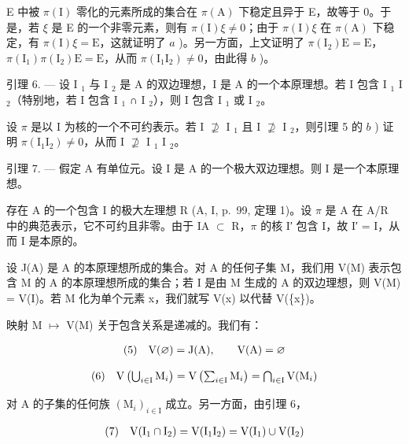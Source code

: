 E 中被 \(\pi(\mathrm{I})\) 零化的元素所成的集合在 \(\pi(\mathrm{A})\) 下稳定且异于 E，故等于 0。于是，若 \(\xi\) 是 E 的一个非零元素，则有 \(\pi(\mathrm{I})\xi \neq 0\)；由于 \(\pi(\mathrm{I})\xi\) 在 \(\pi(\mathrm{A})\) 下稳定，有 \(\pi(\mathrm{I})\xi = \mathrm{E}\)，这就证明了 \(a\) )。另一方面，上文证明了 \(\pi(\mathrm{I}_2)\mathrm{E} = \mathrm{E}\)，\(\pi(\mathrm{I}_1)\pi(\mathrm{I}_2)\mathrm{E} = \mathrm{E}\)，从而 \(\pi(\mathrm{I}_1\mathrm{I}_2) \neq 0\)，由此得 \(b\) )。

引理 6. --- 设 I \(_{1}\) 与 I \(_{2}\) 是 A 的双边理想，I 是 A 的一个本原理想。若 I 包含 I \(_{1}\) I \(_{2}\)（特别地，若 I 包含 I \(_{1}\) ∩ I \(_{2}\)），则 I 包含 I \(_{1}\) 或 I \(_{2}\)。

设 \(\pi\) 是以 I 为核的一个不可约表示。若 I \(\not\supseteq\) I \(_1\) 且 I \(\not\supseteq\) I \(_2\)，则引理 5 的 \(b\) ) 证明 \(\pi(\text{I}_1\text{I}_2) \neq 0\)，从而 I \(\not\supseteq\) I \(_1\) I \(_2\)。

引理 7. --- 假定 A 有单位元。设 I 是 A 的一个极大双边理想。则 I 是一个本原理想。

存在 A 的一个包含 I 的极大左理想 R (A, I, p.~99, 定理 1)。设 \(\pi\) 是 A 在 A/R 中的典范表示，它不可约且非零。由于 IA \(\subset\) R，\(\pi\) 的核 I′ 包含 I，故 I′ = I，从而 I 是本原的。

设 J(A) 是 A 的本原理想所成的集合。对 A 的任何子集 M，我们用 V(M) 表示包含 M 的 A 的本原理想所成的集合；若 I 是由 M 生成的 A 的双边理想，则 V(M) = V(I)。若 M 化为单个元素 x，我们就写 V(x) 以代替 V(\{x\})。

映射 M \(\mapsto\) V(M) 关于包含关系是递减的。我们有：

\[
\begin{array}{r l} (5) & \mathrm{V} (\varnothing) = \mathrm{J} (\mathrm{A}), \qquad \mathrm{V} (\mathrm{A}) = \varnothing \end{array}
\]

\[
\begin{array}{r l} (6) & \mathrm{V} \left(\bigcup_ {i \in \mathrm{I}} \mathrm{M} _ {i}\right) = \mathrm{V} \left(\sum_ {i \in \mathrm{I}} \mathrm{M} _ {i}\right) = \bigcap_ {i \in \mathrm{I}} \mathrm{V} (\mathrm{M} _ {i}) \end{array}
\]

对 A 的子集的任何族 \((\mathrm{M}_{i})_{i\in\mathrm{I}}\) 成立。另一方面，由引理 6，

\[
\begin{array}{r l} (7) & \mathrm{V} (\mathrm{I} _ {1} \cap \mathrm{I} _ {2}) = \mathrm{V} (\mathrm{I} _ {1} \mathrm{I} _ {2}) = \mathrm{V} (\mathrm{I} _ {1}) \cup \mathrm{V} (\mathrm{I} _ {2}) \end{array}
\]

